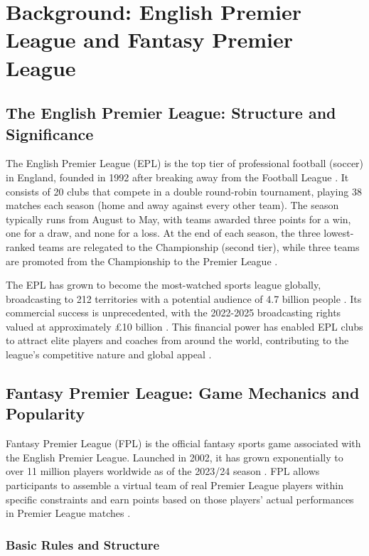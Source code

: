 \section{Background: English Premier League and Fantasy Premier League}

\subsection{The English Premier League: Structure and Significance}

The English Premier League (EPL) is the top tier of professional football (soccer) in England, founded in 1992 after breaking away from the Football League \cite{conn2017}. It consists of 20 clubs that compete in a double round-robin tournament, playing 38 matches each season (home and away against every other team). The season typically runs from August to May, with teams awarded three points for a win, one for a draw, and none for a loss. At the end of each season, the three lowest-ranked teams are relegated to the Championship (second tier), while three teams are promoted from the Championship to the Premier League \cite{premierleague2023}.

The EPL has grown to become the most-watched sports league globally, broadcasting to 212 territories with a potential audience of 4.7 billion people \cite{buraimo2015}. Its commercial success is unprecedented, with the 2022-2025 broadcasting rights valued at approximately £10 billion \cite{evens2022}. This financial power has enabled EPL clubs to attract elite players and coaches from around the world, contributing to the league's competitive nature and global appeal \cite{szymanski2005}.

\subsection{Fantasy Premier League: Game Mechanics and Popularity}

Fantasy Premier League (FPL) is the official fantasy sports game associated with the English Premier League. Launched in 2002, it has grown exponentially to over 11 million players worldwide as of the 2023/24 season \cite{fpl2023}. FPL allows participants to assemble a virtual team of real Premier League players within specific constraints and earn points based on those players' actual performances in Premier League matches \cite{bonomo2014}.

\subsubsection{Basic Rules and Structure} \label{ch:team_selection_constraints}

